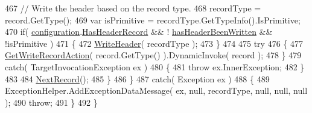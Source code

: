 \begin{DoxyCode}
467                     \textcolor{comment}{// Write the header based on the record type.}
468                     recordType = record.GetType();
469                     var isPrimitive = recordType.GetTypeInfo().IsPrimitive;
470                     \textcolor{keywordflow}{if}( \hyperlink{a00061_a0711748c9a399cfbcbad93857304fc67}{configuration}.\hyperlink{a00043_a9e439f90bfac500d24d6e2e731240439}{HasHeaderRecord} && !
      \hyperlink{a00061_a48b53b7f4428286805b1eaac1055b2bf}{hasHeaderBeenWritten} && !isPrimitive )
471                     \{
472                         \hyperlink{a00061_af2298dcd2934550fd9dd592921f18541}{WriteHeader}( recordType );
473                     \}
474 
475                     \textcolor{keywordflow}{try}
476                     \{
477                         \hyperlink{a00061_a1ab2b602b050ceb6f0a0874504ddf3f3}{GetWriteRecordAction}( record.GetType() ).DynamicInvoke( record 
      );
478                     \}
479                     \textcolor{keywordflow}{catch}( TargetInvocationException ex )
480                     \{
481                         \textcolor{keywordflow}{throw} ex.InnerException;
482                     \}
483 
484                     \hyperlink{a00061_a397af8c87002d3b9c2b5152c6981d4d2}{NextRecord}();
485                 \}
486             \}
487             \textcolor{keywordflow}{catch}( Exception ex )
488             \{
489                 ExceptionHelper.AddExceptionDataMessage( ex, null, recordType, null, null, null );
490                 \textcolor{keywordflow}{throw};
491             \}
492         \}
\end{DoxyCode}


